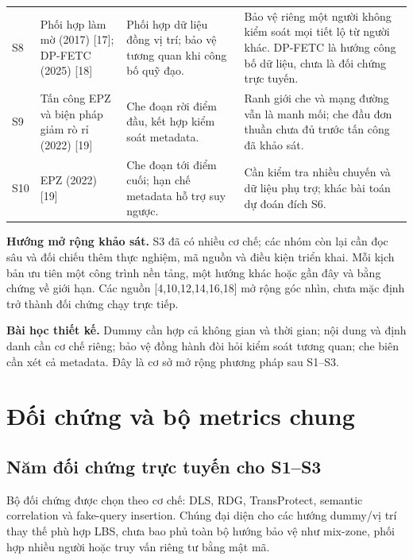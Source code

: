 \documentclass[10pt,a4paper]{article}
\begin{document}
\begin{tabularx}{\linewidth}{@{}P{0.65cm}P{3.25cm}Y Y@{}}
S8 & Phối hợp làm mờ (2017) [17]; DP-FETC (2025) [18] & Phối hợp dữ liệu đồng vị trí; bảo vệ tương quan khi công bố quỹ đạo. & Bảo vệ riêng một người không kiểm soát mọi tiết lộ từ người khác. DP-FETC là hướng công bố dữ liệu, chưa là đối chứng trực tuyến.\\
S9 & Tấn công EPZ và biện pháp giảm rò rỉ (2022) [19] & Che đoạn rời điểm đầu, kết hợp kiểm soát metadata. & Ranh giới che và mạng đường vẫn là manh mối; che đầu đơn thuần chưa đủ trước tấn công đã khảo sát.\\
S10 & EPZ (2022) [19] & Che đoạn tới điểm cuối; hạn chế metadata hỗ trợ suy ngược. & Cần kiểm tra nhiều chuyến và dữ liệu phụ trợ; khác bài toán dự đoán đích S6.\\\bottomrule
\end{tabularx}
\normalsize

\textbf{Hướng mở rộng khảo sát.} S3 đã có nhiều cơ chế; các nhóm còn lại cần đọc sâu và đối chiếu thêm thực nghiệm, mã nguồn và điều kiện triển khai. Mỗi kịch bản ưu tiên một công trình nền tảng, một hướng khác hoặc gần đây và bằng chứng về giới hạn. Các nguồn [4,10,12,14,16,18] mở rộng góc nhìn, chưa mặc định trở thành đối chứng chạy trực tiếp.

\textbf{Bài học thiết kế.} Dummy cần hợp cả không gian và thời gian; nội dung và định danh cần cơ chế riêng; bảo vệ đồng hành đòi hỏi kiểm soát tương quan; che biên cần xét cả metadata. Đây là cơ sở mở rộng phương pháp sau S1--S3.

\newpage
\section{Đối chứng và bộ metrics chung}
\subsection{Năm đối chứng trực tuyến cho S1--S3}
Bộ đối chứng được chọn theo cơ chế: DLS, RDG, TransProtect, semantic correlation và fake-query insertion. Chúng đại diện cho các hướng dummy/vị trí thay thế phù hợp LBS, chưa bao phủ toàn bộ hướng bảo vệ như mix-zone, phối hợp nhiều người hoặc truy vấn riêng tư bằng mật mã.
\end{document}
